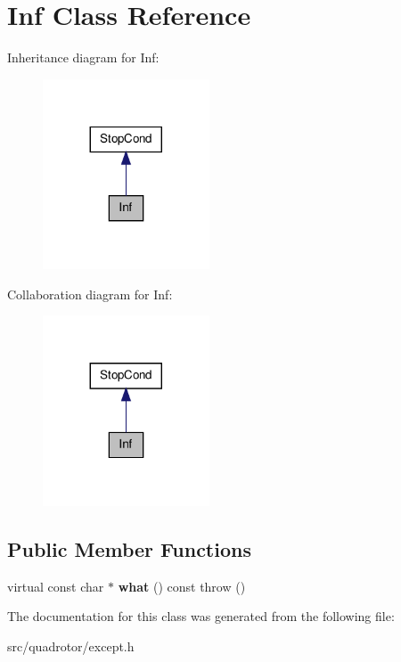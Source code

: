 \hypertarget{classInf}{\section{\-Inf \-Class \-Reference}
\label{classInf}
}


\-Inheritance diagram for \-Inf\-:\nopagebreak
\begin{figure}[H]
\begin{center}
\leavevmode
\includegraphics[width=140pt]{classInf__inherit__graph}
\end{center}
\end{figure}


\-Collaboration diagram for \-Inf\-:\nopagebreak
\begin{figure}[H]
\begin{center}
\leavevmode
\includegraphics[width=140pt]{classInf__coll__graph}
\end{center}
\end{figure}
\subsection*{\-Public \-Member \-Functions}
\begin{DoxyCompactItemize}
\item 
\hypertarget{classInf_ad631c9e417358223b219a0d27321ccab}{virtual const char $\ast$ {\bfseries what} () const   throw ()}\label{classInf_ad631c9e417358223b219a0d27321ccab}

\end{DoxyCompactItemize}


\-The documentation for this class was generated from the following file\-:\begin{DoxyCompactItemize}
\item 
src/quadrotor/except.\-h\end{DoxyCompactItemize}

